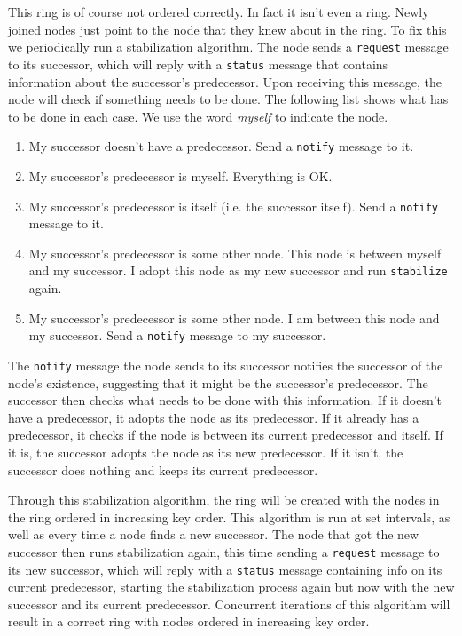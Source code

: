 \documentclass[a4paper, 11pt]{article}
\begin{document}
This ring is of course not ordered correctly. In fact it isn't even a ring. Newly joined nodes just point to the node that they knew about in the ring. To fix this we periodically run a stabilization algorithm. The node sends a \texttt{request} message to its successor, which will reply with a \texttt{status} message that contains information about the successor's predecessor. Upon receiving this message, the node will check if something needs to be done. The following list shows what has to be done in each case. We use the word \textit{myself} to indicate the node.

\begin{enumerate}
    \item My successor doesn't have a predecessor. Send a \texttt{notify} message to it.
    \item My successor's predecessor is myself. Everything is OK.
    \item My successor's predecessor is itself (i.e. the successor itself). Send a \texttt{notify} message to it.
    \item My successor's predecessor is some other node. This node is between myself and my successor. I adopt this node as my new successor and run \texttt{stabilize} again.
    \item My successor's predecessor is some other node. I am between this node and my successor. Send a \texttt{notify} message to my successor.
\end{enumerate}

The \texttt{notify} message the node sends to its successor notifies the successor of the node's existence, suggesting that it might be the successor's predecessor. 
The successor then checks what needs to be done with this information. 
If it doesn't have a predecessor, it adopts the node as its predecessor. 
If it already has a predecessor, it checks if the node is between its current predecessor and itself. 
If it is, the successor adopts the node as its new predecessor. 
If it isn't, the successor does nothing and keeps its current predecessor.

Through this stabilization algorithm, the ring will be created with the nodes in the ring ordered in increasing key order. This algorithm is run at set intervals, as well as every time a node finds a new successor. The node that got the new successor then runs stabilization again, this time sending a \texttt{request} message to its new successor, which will reply with a \texttt{status} message containing info on its current predecessor, starting the stabilization process again but now with the new successor and its current predecessor. Concurrent iterations of this algorithm will result in a correct ring with nodes ordered in increasing key order.
\end{document}

